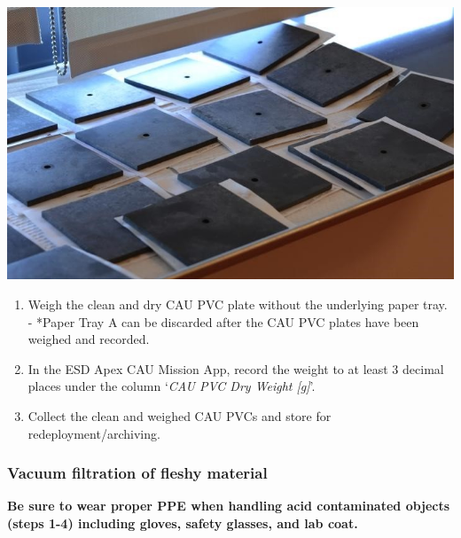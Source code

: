 \documentclass[
]{book}
\begin{document}
\includegraphics{images/CAU_drying.jpg}

\begin{enumerate}
\def\labelenumi{\arabic{enumi}.}
\setcounter{enumi}{12}
\item
  Weigh the clean and dry CAU PVC plate without the underlying paper tray. - *Paper Tray A can be discarded after the CAU PVC plates have been weighed and recorded.
\item
  In the ESD Apex CAU Mission App, record the weight to at least 3 decimal places under the column `\emph{CAU PVC Dry Weight {[}g{]}}'.
\item
  Collect the clean and weighed CAU PVCs and store for redeployment/archiving.
\end{enumerate}

\hypertarget{vacuum-filtration-of-fleshy-material}{%
\subsubsection{Vacuum filtration of fleshy material}\label{vacuum-filtration-of-fleshy-material}}

\textbf{Be sure to wear proper PPE when handling acid contaminated objects (steps 1-4) including gloves, safety glasses, and lab coat.}
\end{document}
